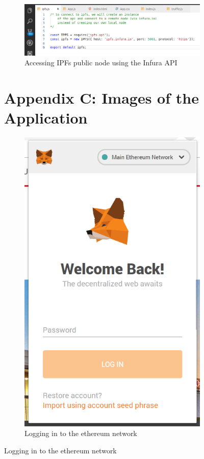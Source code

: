 \begin{figure}[H]
\begin{figure}[H]
\includegraphics[scale=0.5]{images/codeinfura.png}
\caption{Accessing IPFs public node using the Infura API}
\end{figure}

\section{Appendix C: Images of the Application}
\begin{figure}[H]
\center
\includegraphics[scale=0.6]{images/metamasklogin.png}
\caption{Logging in to the ethereum network}
\end{figure}


\end{figure}
